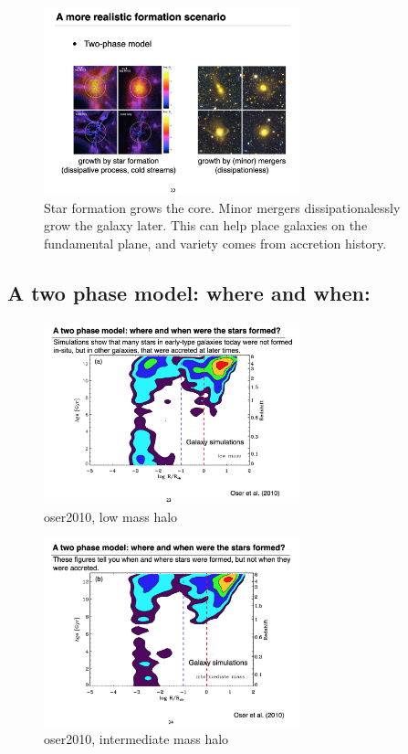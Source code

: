 \documentclass{article}
\begin{document}
\begin{figure}
    \centering
    \includegraphics[width=0.66\textwidth]{figs/Screen Shot 2021-10-20 at 10.54.40 AM.png}
    \caption{Star formation grows the core. Minor mergers dissipationalessly grow the galaxy later. This can help place galaxies on the fundamental plane, and variety comes from accretion history.}
    \label{fig:vo3}
\end{figure}

\subsection{A two phase model: where and when:}

\begin{figure}
    \centering
\includegraphics[width=0.66\textwidth]{figs/Screen Shot 2021-10-20 at 10.56.54 AM.png}
    \caption{oser2010, low mass halo}
    \label{fig:vo}
\end{figure}

\begin{figure}
    \centering
\includegraphics[width=0.66\textwidth]{figs/Screen Shot 2021-10-20 at 10.59.33 AM.png}
    \caption{oser2010, intermediate mass halo}
    \label{fig:vo2}
\end{figure}
\end{document}
